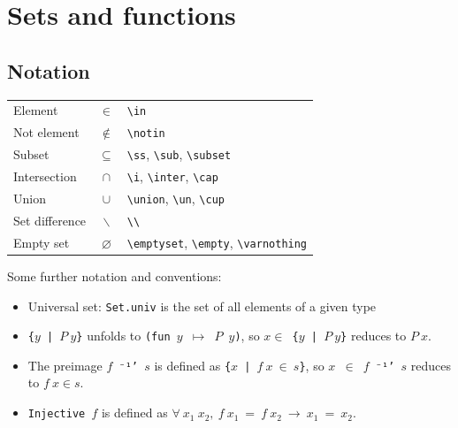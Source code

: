 \documentclass[a4paper]{article}
\begin{document}
\section{Sets and functions}

\subsection*{Notation}

\vspace{10pt}

\begin{tabular}{lcl}
    Element & $\in$ & \verb|\in| \\
    Not element & $\notin$ & \verb|\notin| \\
    Subset & $\subseteq$ & \verb|\ss|, \verb|\sub|, \verb|\subset| \\
    Intersection & $\cap$ & \verb|\i|, \verb|\inter|, \verb|\cap| \\
    Union & $\cup$ & \verb|\union|, \verb|\un|, \verb|\cup| \\
    Set difference & $\backslash$ & \verb|\\| \\
    Empty set & $\varnothing$ & \verb|\emptyset|, \verb|\empty|, \verb|\varnothing|
\end{tabular}

\vspace{10pt}

Some further notation and conventions:
\begin{itemize}
    \item Universal set: \verb|Set.univ| is the set of all elements of a given type
    \item \texttt{\{$y$ | $P\ y$\}} unfolds to \texttt{(fun $y$ $\mapsto$ $P$ $y$)}, so \texttt{$x \in$ \{$y$ | $P\ y$\}} reduces to $P\ x$.
    \item The preimage \texttt{$f$ ⁻¹' $s$} is defined as \texttt{\{$x$ | $f\ x\ \in\ s$\}}, so \texttt{$x$ $\in$ $f$ ⁻¹' $s$} reduces to $f\ x \in s$.
    \item \texttt{Injective $f$} is defined as $\forall\ x_1\ x_2,\ f\ x_1\ =\ f\ x_2\ \to\ x_1\ =\ x_2$.
\end{itemize}
\end{document}

